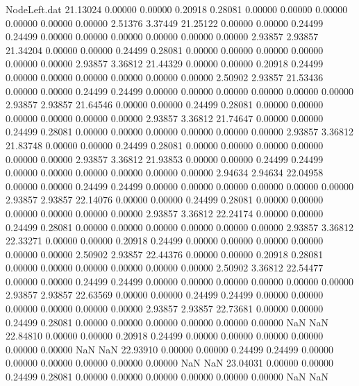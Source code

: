 \begin{filecontents}{NodeLeft.dat}
  21.13024    0.00000    0.00000     0.20918    0.28081    0.00000    0.00000    0.00000    0.00000    0.00000    0.00000    2.51376    3.37449
  21.25122    0.00000    0.00000     0.24499    0.24499    0.00000    0.00000    0.00000    0.00000    0.00000    0.00000    2.93857    2.93857
  21.34204    0.00000    0.00000     0.24499    0.28081    0.00000    0.00000    0.00000    0.00000    0.00000    0.00000    2.93857    3.36812
  21.44329    0.00000    0.00000     0.20918    0.24499    0.00000    0.00000    0.00000    0.00000    0.00000    0.00000    2.50902    2.93857
  21.53436    0.00000    0.00000     0.24499    0.24499    0.00000    0.00000    0.00000    0.00000    0.00000    0.00000    2.93857    2.93857
  21.64546    0.00000    0.00000     0.24499    0.28081    0.00000    0.00000    0.00000    0.00000    0.00000    0.00000    2.93857    3.36812
  21.74647    0.00000    0.00000     0.24499    0.28081    0.00000    0.00000    0.00000    0.00000    0.00000    0.00000    2.93857    3.36812
  21.83748    0.00000    0.00000     0.24499    0.28081    0.00000    0.00000    0.00000    0.00000    0.00000    0.00000    2.93857    3.36812
  21.93853    0.00000    0.00000     0.24499    0.24499    0.00000    0.00000    0.00000    0.00000    0.00000    0.00000    2.94634    2.94634
  22.04958    0.00000    0.00000     0.24499    0.24499    0.00000    0.00000    0.00000    0.00000    0.00000    0.00000    2.93857    2.93857
  22.14076    0.00000    0.00000     0.24499    0.28081    0.00000    0.00000    0.00000    0.00000    0.00000    0.00000    2.93857    3.36812
  22.24174    0.00000    0.00000     0.24499    0.28081    0.00000    0.00000    0.00000    0.00000    0.00000    0.00000    2.93857    3.36812
  22.33271    0.00000    0.00000     0.20918    0.24499    0.00000    0.00000    0.00000    0.00000    0.00000    0.00000    2.50902    2.93857
  22.44376    0.00000    0.00000     0.20918    0.28081    0.00000    0.00000    0.00000    0.00000    0.00000    0.00000    2.50902    3.36812
  22.54477    0.00000    0.00000     0.24499    0.24499    0.00000    0.00000    0.00000    0.00000    0.00000    0.00000    2.93857    2.93857
  22.63569    0.00000    0.00000     0.24499    0.24499    0.00000    0.00000    0.00000    0.00000    0.00000    0.00000    2.93857    2.93857
  22.73681    0.00000    0.00000     0.24499    0.28081    0.00000    0.00000    0.00000    0.00000    0.00000    0.00000        NaN        NaN
  22.84810    0.00000    0.00000     0.20918    0.24499    0.00000    0.00000    0.00000    0.00000    0.00000    0.00000        NaN        NaN
  22.93910    0.00000    0.00000     0.24499    0.24499    0.00000    0.00000    0.00000    0.00000    0.00000    0.00000        NaN        NaN
  23.04031    0.00000    0.00000     0.24499    0.28081    0.00000    0.00000    0.00000    0.00000    0.00000    0.00000        NaN        NaN
\end{filecontents}
